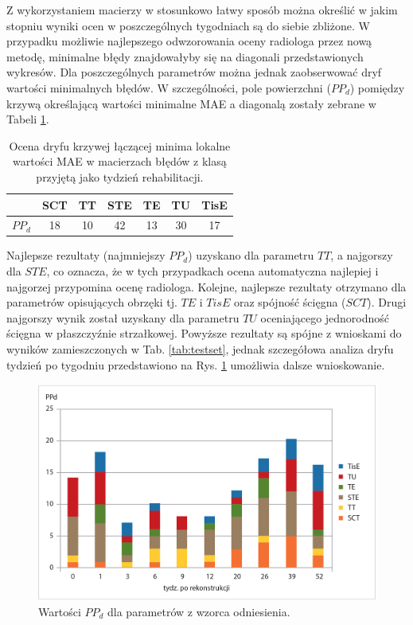 Z wykorzystaniem macierzy w stosunkowo łatwy sposób można określić w jakim stopniu wyniki ocen w poszczególnych tygodniach są do siebie zbliżone. W przypadku możliwie najlepszego odwzorowania oceny radiologa przez nową metodę, minimalne błędy znajdowałyby się na diagonali przedstawionych wykresów. Dla poszczególnych parametrów można jednak zaobserwować dryf wartości minimalnych błędów. W szczególności, pole powierzchni ($PP_d$) pomiędzy krzywą określającą wartości minimalne MAE a diagonalą zostały zebrane w Tabeli \ref{tab:dryf_meas}. 

\begin{table}[]
	\caption{Ocena dryfu krzywej łączącej minima lokalne wartości MAE w macierzach błędów z klasą przyjętą jako tydzień rehabilitacji.}
	\begin{center}
		\begin{tabular}{l||c|c|c|c|c|c}
		
			& \textbf{SCT} & \textbf{TT} & \textbf{STE} & \textbf{TE} & \textbf{TU} & \textbf{TisE}\\ 
			\hline \hline
			$PP_d$ &18&10&42&13&30&17\\	
					
		\end{tabular}
	\end{center}
	\label{tab:dryf_meas}
\end{table}

Najlepsze rezultaty (najmniejszy $PP_d$) uzyskano dla parametru $TT$, a najgorszy dla $STE$, co oznacza, że w tych przypadkach ocena automatyczna najlepiej i najgorzej przypomina ocenę radiologa. Kolejne, najlepsze rezultaty otrzymano dla parametrów opisujących obrzęki tj. $TE$ i $TisE$ oraz spójność ścięgna ($SCT$). Drugi najgorszy wynik został uzyskany dla parametru $TU$ oceniającego jednorodność ścięgna w płaszczyźnie strzałkowej. Powyższe rezultaty są spójne z wnioskami do wyników zamieszczonych w Tab. \ref{tab:testset}, jednak szczegółowa analiza dryfu tydzień po tygodniu przedstawiono na Rys. \ref{fig:CM_MAE_SUMMARY} umożliwia dalsze wnioskowanie.

\begin{figure}[]
	\centering
	\includegraphics[width=1\textwidth]{figures/cm_summary.jpg}
	\caption{Wartości $PP_d$ dla parametrów z wzorca odniesienia.}\label{fig:CM_MAE_SUMMARY}
\end{figure}


